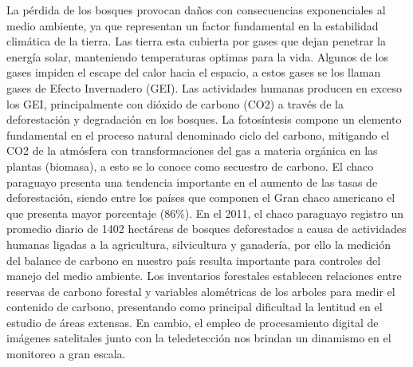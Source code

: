La p\'erdida de los bosques provocan da\~{n}os con consecuencias exponenciales al medio ambiente, ya que representan un factor fundamental en la estabilidad clim\'atica de la tierra. Las tierra esta cubierta por gases que dejan penetrar la energ\'ia solar, manteniendo temperaturas optimas para la vida. Algunos de los gases impiden el escape del calor hacia el espacio, a estos gases se los llaman gases de Efecto Invernadero (GEI). Las actividades humanas producen en exceso los GEI, principalmente con di\'oxido de carbono (CO2) a trav\'es de la deforestaci\'on y degradaci\'on en los bosques. La fotos\'intesis compone un elemento fundamental en el proceso natural denominado ciclo del carbono, mitigando el CO2 de la atm\'osfera con transformaciones del gas a materia org\'anica en las plantas (biomasa), a esto se lo conoce como secuestro de carbono. El chaco paraguayo presenta una tendencia importante en el aumento de las tasas de deforestaci\'on, siendo entre los pa\'ises que componen el Gran chaco americano el que presenta mayor porcentaje (86\%). 
En el 2011, el chaco paraguayo registro un promedio diario de 1402 hect\'areas de bosques deforestados a causa de actividades humanas ligadas a la agricultura, silvicultura y ganader\'ia, por ello la medici\'on del balance de carbono en nuestro pa\'is resulta importante para controles del manejo del medio ambiente. Los inventarios forestales establecen relaciones entre reservas de carbono forestal y variables alom\'etricas de los arboles  para medir el contenido de carbono, presentando como principal dificultad la lentitud en el estudio de \'areas extensas. En cambio, el empleo de procesamiento digital de im\'agenes satelitales junto con la teledetecci\'on nos brindan un dinamismo en el monitoreo a gran escala.